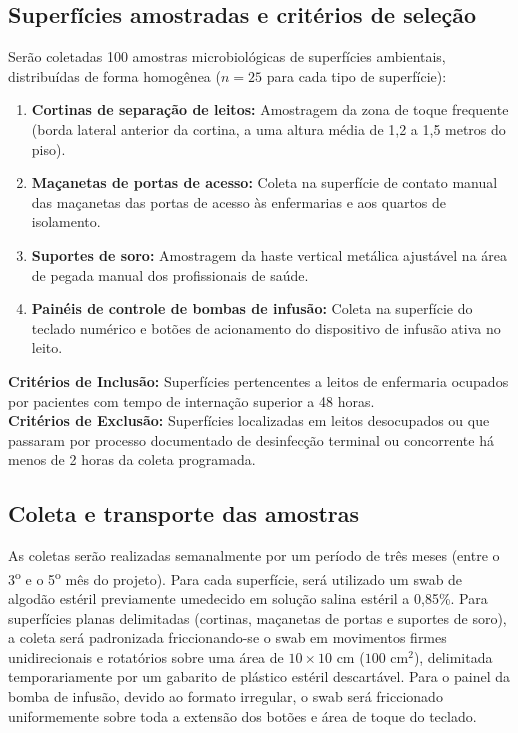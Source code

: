 \documentclass[12pt,a4paper]{article}
\begin{document}
\subsection{Superfícies amostradas e critérios de seleção}
Serão coletadas 100 amostras microbiológicas de superfícies ambientais, distribuídas de forma homogênea ($n = 25$ para cada tipo de superfície):
\begin{enumerate}
    \item \textbf{Cortinas de separação de leitos:} Amostragem da zona de toque frequente (borda lateral anterior da cortina, a uma altura média de 1,2 a 1,5 metros do piso).
    \item \textbf{Maçanetas de portas de acesso:} Coleta na superfície de contato manual das maçanetas das portas de acesso às enfermarias e aos quartos de isolamento.
    \item \textbf{Suportes de soro:} Amostragem da haste vertical metálica ajustável na área de pegada manual dos profissionais de saúde.
    \item \textbf{Painéis de controle de bombas de infusão:} Coleta na superfície do teclado numérico e botões de acionamento do dispositivo de infusão ativa no leito.
\end{enumerate}
\noindent\textbf{Critérios de Inclusão:} Superfícies pertencentes a leitos de enfermaria ocupados por pacientes com tempo de internação superior a 48 horas.\\
\textbf{Critérios de Exclusão:} Superfícies localizadas em leitos desocupados ou que passaram por processo documentado de desinfecção terminal ou concorrente há menos de 2 horas da coleta programada.

\subsection{Coleta e transporte das amostras}
As coletas serão realizadas semanalmente por um período de três meses (entre o 3\textsuperscript{o} e o 5\textsuperscript{o} mês do projeto). Para cada superfície, será utilizado um swab de algodão estéril previamente umedecido em solução salina estéril a 0,85\%. Para superfícies planas delimitadas (cortinas, maçanetas de portas e suportes de soro), a coleta será padronizada friccionando-se o swab em movimentos firmes unidirecionais e rotatórios sobre uma área de $10\times10$ cm ($100\text{ cm}^2$), delimitada temporariamente por um gabarito de plástico estéril descartável. Para o painel da bomba de infusão, devido ao formato irregular, o swab será friccionado uniformemente sobre toda a extensão dos botões e área de toque do teclado.
\end{document}
